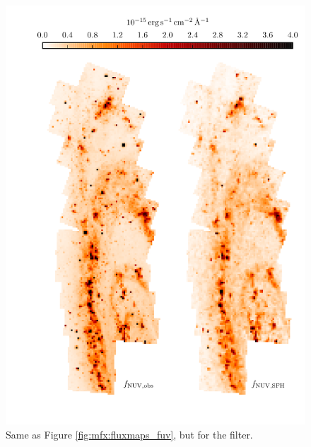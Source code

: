\begin{figure}
\centering
\includegraphics[scale=0.9]{m31flux-figures/fluxmaps_nuv.pdf}
\caption[Observed and synthetic attenuated \nuv{} flux maps.]{Same as Figure
    \ref{fig:mfx:fluxmaps_fuv}, but for the \nuv{} filter.
}
\label{fig:mfx:fluxmaps_nuv}
\end{figure}


%
%






